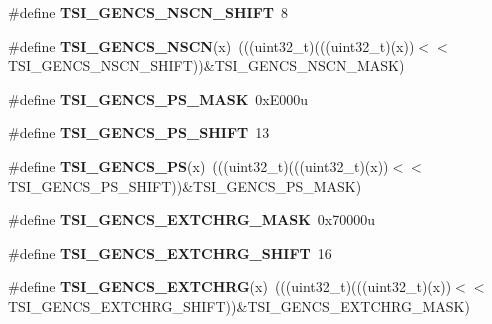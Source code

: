 \begin{DoxyCompactItemize}
\#define {\bfseries T\+S\+I\+\_\+\+G\+E\+N\+C\+S\+\_\+\+N\+S\+C\+N\+\_\+\+S\+H\+I\+FT}~8
\item 
\mbox{\label{group___t_s_i___register___masks_gad18125542d6e5cebc57833da32c13668}} 
\#define {\bfseries T\+S\+I\+\_\+\+G\+E\+N\+C\+S\+\_\+\+N\+S\+CN}(x)~(((uint32\+\_\+t)(((uint32\+\_\+t)(x))$<$$<$T\+S\+I\+\_\+\+G\+E\+N\+C\+S\+\_\+\+N\+S\+C\+N\+\_\+\+S\+H\+I\+FT))\&T\+S\+I\+\_\+\+G\+E\+N\+C\+S\+\_\+\+N\+S\+C\+N\+\_\+\+M\+A\+SK)
\item 
\mbox{\label{group___t_s_i___register___masks_ga3c608c250c31872d206e9c18eea97799}} 
\#define {\bfseries T\+S\+I\+\_\+\+G\+E\+N\+C\+S\+\_\+\+P\+S\+\_\+\+M\+A\+SK}~0x\+E000u
\item 
\mbox{\label{group___t_s_i___register___masks_gaae1f3b081a9c92fefe10bd3ec1f40734}} 
\#define {\bfseries T\+S\+I\+\_\+\+G\+E\+N\+C\+S\+\_\+\+P\+S\+\_\+\+S\+H\+I\+FT}~13
\item 
\mbox{\label{group___t_s_i___register___masks_ga0562bb631fc7da30eaf08301b5430d53}} 
\#define {\bfseries T\+S\+I\+\_\+\+G\+E\+N\+C\+S\+\_\+\+PS}(x)~(((uint32\+\_\+t)(((uint32\+\_\+t)(x))$<$$<$T\+S\+I\+\_\+\+G\+E\+N\+C\+S\+\_\+\+P\+S\+\_\+\+S\+H\+I\+FT))\&T\+S\+I\+\_\+\+G\+E\+N\+C\+S\+\_\+\+P\+S\+\_\+\+M\+A\+SK)
\item 
\mbox{\label{group___t_s_i___register___masks_ga14b70379252ea633e8c97c1ab13553c6}} 
\#define {\bfseries T\+S\+I\+\_\+\+G\+E\+N\+C\+S\+\_\+\+E\+X\+T\+C\+H\+R\+G\+\_\+\+M\+A\+SK}~0x70000u
\item 
\mbox{\label{group___t_s_i___register___masks_gaf6315fa37479b4e49a6f3252a451352b}} 
\#define {\bfseries T\+S\+I\+\_\+\+G\+E\+N\+C\+S\+\_\+\+E\+X\+T\+C\+H\+R\+G\+\_\+\+S\+H\+I\+FT}~16
\item 
\mbox{\label{group___t_s_i___register___masks_gab5fefdd5c15d6e5d832d2843a15a167a}} 
\#define {\bfseries T\+S\+I\+\_\+\+G\+E\+N\+C\+S\+\_\+\+E\+X\+T\+C\+H\+RG}(x)~(((uint32\+\_\+t)(((uint32\+\_\+t)(x))$<$$<$T\+S\+I\+\_\+\+G\+E\+N\+C\+S\+\_\+\+E\+X\+T\+C\+H\+R\+G\+\_\+\+S\+H\+I\+FT))\&T\+S\+I\+\_\+\+G\+E\+N\+C\+S\+\_\+\+E\+X\+T\+C\+H\+R\+G\+\_\+\+M\+A\+SK)
$$
\end{DoxyCompactItemize}
